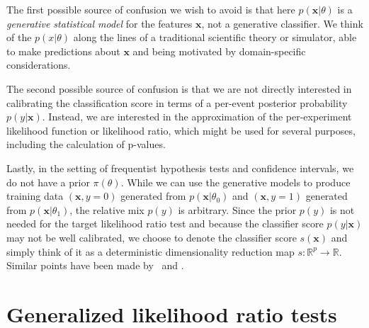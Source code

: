 \documentclass[12pt]{article}
\numberwithin{equation}{section}
\theoremstyle{plain}
\begin{document}
The first possible source of confusion we wish to avoid is that here
$p(\mathbf{x}|\theta)$  is a  \textit{generative statistical model} for the features $\mathbf{x}$,
not a generative classifier. We think of the  $p(x|\theta)$ along the lines of a
traditional scientific theory or simulator, able to make predictions about $\mathbf{x}$
and being motivated by domain-specific considerations.

The second possible source of confusion is that we are not directly interested
in calibrating the classification score in terms of a per-event posterior
probability $p(y|\mathbf{x})$. Instead, we are interested in the approximation of the
per-experiment likelihood function or likelihood ratio, which might be used for
several purposes, including the calculation of p-values.

Lastly, in the setting of frequentist hypothesis tests and confidence intervals,
we do not have a prior $\pi(\theta)$. While we can use the generative models to
produce training data $(\mathbf{x} ,y=0)$ generated from
$p(\mathbf{x}|\theta_0)$ and $(\mathbf{x}, y=1)$ generated from
$p(\mathbf{x}|\theta_1)$, the relative mix $p(y)$ is arbitrary. Since the prior
$p(y)$ is not needed for the target likelihood ratio test and because the
classifier score $p(y|\mathbf{x})$ may not be well calibrated, we choose to denote the
classifier score $s(\mathbf{x})$ and simply think of it as a deterministic dimensionality
reduction map $s: \mathbb{R}^p \to \mathbb{R}$.  Similar points have been made
by~\cite{ClaytonScott} and \cite{Neal:2007zz}.




\section{Generalized likelihood ratio tests}
\label{sec:generalized-likelihood-ratio}

\end{document}
